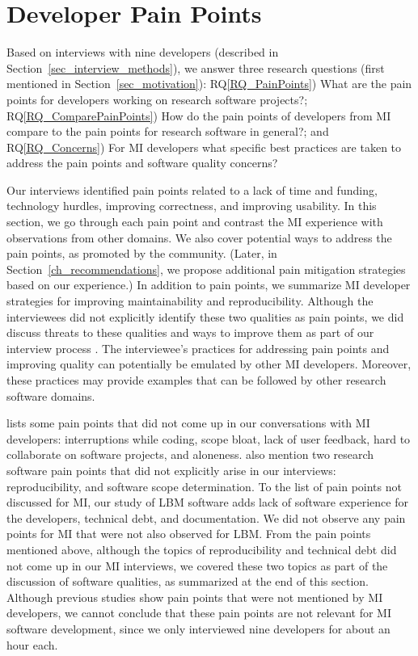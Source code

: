 \documentclass[final, 12pt, 3p, times]{elsarticle}
\newcommand{\rqref}[1]{RQ\ref{#1}}
\begin{document}
\section{Developer Pain Points} \label{painpoints}

Based on interviews with nine developers (described in
Section~\ref{sec_interview_methods}), we answer three research questions (first
mentioned in Section~\ref{sec_motivation}): \rqref{RQ_PainPoints}) What are the
pain points for developers working on research software projects?;
\rqref{RQ_ComparePainPoints}) How do the pain points of developers from MI
compare to the pain points for research software in general?; and
\rqref{RQ_Concerns}) For MI developers what specific best practices are taken to
address the pain points and software quality concerns? 

Our interviews identified pain points related to a lack of time and funding,
technology hurdles, improving correctness, and improving usability.  In this
section, we go through each pain point and contrast the MI experience with
observations from other domains.  We also cover potential ways to address the
pain points, as promoted by the community.  (Later, in
Section~\ref{ch_recommendations}, we propose additional pain mitigation
strategies based on our experience.)  In addition to pain points, we summarize
MI developer strategies for improving maintainability and reproducibility.
Although the interviewees did not explicitly identify these two qualities as
pain points, we did discuss threats to these qualities and ways to improve them
as part of our interview process \cite{SmithEtAl2021}.  The interviewee's
practices for addressing pain points and improving quality can potentially be
emulated by other MI developers. Moreover, these practices may provide examples
that can be followed by other research software domains.

\cite{PintoEtAl2018} lists some pain points that did not come up in our
conversations with MI developers: interruptions while coding, scope bloat, lack
of user feedback, hard to collaborate on software projects, and aloneness.
\cite{WieseEtAl2019} also mention two research software pain points that did
not explicitly arise in our interviews: reproducibility, and software scope
determination.  To the list of pain points not discussed for MI, our study of
LBM software \cite{SmithEtAl2024} adds lack of software experience for the
developers, technical debt, and documentation. We did not observe any pain
points for MI that were not also observed for LBM. From the pain points
mentioned above, although the topics of reproducibility and technical debt did
not come up in our MI interviews, we covered these two topics as part of the
discussion of software qualities, as summarized at the end of this section.
Although previous studies show pain points that were not mentioned by MI
developers, we cannot conclude that these pain points are not relevant for MI
software development, since we only interviewed nine developers for about an
hour each.
\end{document}
